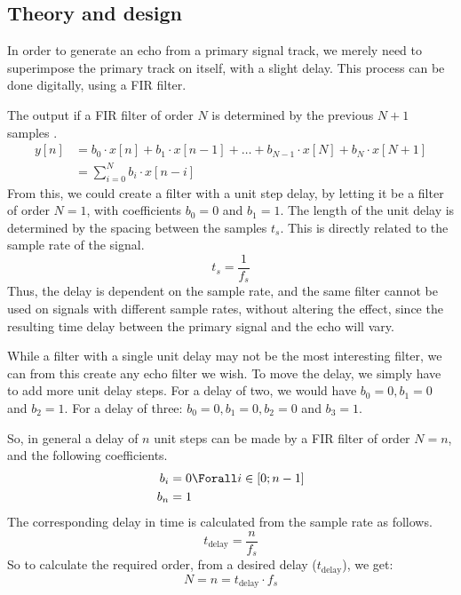 
\subsection{Theory and design}
In order to generate an echo from a primary signal track, we merely need to superimpose the primary track on itself, with a slight delay. This process can be done digitally, using a FIR filter.

The output if a FIR filter of order $N$ is determined by the previous $N + 1$ samples .
\begin{align}
y[n] & = b_{0} \cdot x[n] + b_{1} \cdot x[n - 1] + \dots + b_{N - 1} \cdot x[N] + b_{N} \cdot x[N + 1] \nonumber \\
& = \sum_{i = 0}^{N} b_{i} \cdot x[n - i]
\end{align}
From this, we could create a filter with a unit step delay, by letting it be a filter of order $N = 1$, with coefficients $b_{0} = 0$ and $b_{1} = 1$. The length of the unit delay is determined by the spacing between the samples $t_{s}$. This is directly related to the sample rate of the signal.
\begin{equation}
t_{s} = \frac{1}{f_{s}}
\end{equation}
Thus, the delay is dependent on the sample rate, and the same filter cannot be used on signals with different sample rates, without altering the effect, since the resulting time delay between the primary signal and the echo will vary.

While a filter with a single unit delay may not be the most interesting filter, we can from this create any echo filter we wish. To move the delay, we simply have to add more unit delay steps. For a delay of two, we would have $b_{0} = 0, b_{1} = 0$ and $b_{2} = 1$. For a delay of three: $b_{0} = 0, b_{1} = 0, b_{2} = 0$ and $b_{3} = 1$.

So, in general a delay of $n$ unit steps can be made by a FIR filter of order $N = n$, and the following coefficients.
\begin{align}
b_{i} & = 0 \Forall i \in [0; n - 1] \nonumber \\
b_{n} & = 1
\end{align}
The corresponding delay in time is calculated from the sample rate as follows.
\begin{equation}
t_{\textrm{delay}} = \frac{n}{f_{s}}
\end{equation}
So to calculate the required order, from a desired delay ($t_{\textrm{delay}}$), we get:
\begin{equation}
N = n = t_{\textrm{delay}} \cdot f_{s}
\end{equation}
